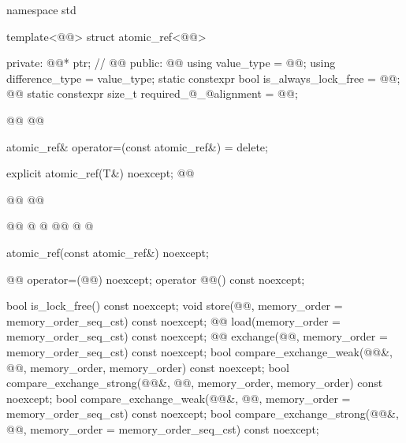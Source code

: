 \begin{codeblock}
namespace std {
  template<@@> struct atomic_ref<@@> {
  private:
    @@* ptr;  // \expos
    @@
  public:
    @@
    using value_type = @@;
    using difference_type = value_type;
    static constexpr bool is_always_lock_free = @@;
    @@
    static constexpr size_t required_@_@alignment = @@;

    @@
    @@

    atomic_ref& operator=(const atomic_ref&) = delete;

    explicit atomic_ref(T&) noexcept;
    @@
    
    @@
    @@
    
    @@
    @  @
    @@
    @  @

    atomic_ref(const atomic_ref&) noexcept;

    @@ operator=(@@) noexcept;
    operator @@() const noexcept;

    bool is_lock_free() const noexcept;
    void store(@@, memory_order = memory_order_seq_cst) const noexcept;
    @@ load(memory_order = memory_order_seq_cst) const noexcept;
    @@ exchange(@@,
                            memory_order = memory_order_seq_cst) const noexcept;
    bool compare_exchange_weak(@@&, @@,
                               memory_order, memory_order) const noexcept;
    bool compare_exchange_strong(@@&, @@,
                                 memory_order, memory_order) const noexcept;
    bool compare_exchange_weak(@@&, @@,
                               memory_order = memory_order_seq_cst) const noexcept;
    bool compare_exchange_strong(@@&, @@,
                                 memory_order = memory_order_seq_cst) const noexcept;

}}
\end{codeblock}
